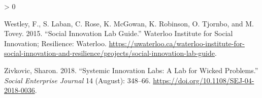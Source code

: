 \documentclass[AMA,STIX1COL,APA,STIX2COL]{WileyNJD-v2}
\newlength{\cslhangindent}
\newenvironment{CSLReferences}[2] %
 {%
  \setlength{\parindent}{0pt}
  \ifodd #1 \everypar{\setlength{\hangindent}{\cslhangindent}}\ignorespaces\fi
  \ifnum #2 > 0
  \setlength{\parskip}{#2\baselineskip}
  \fi
 }%
 {}
\begin{document}
\begin{CSLReferences}{1}{0}
\leavevmode\hypertarget{ref-Westley2015}{}%
Westley, F., S. Laban, C. Rose, K. McGowan, K. Robinson, O. Tjornbo, and
M. Tovey. 2015. {``Social Innovation Lab Guide.''} Waterloo Institute
for Social Innovation; Resilience: Waterloo.
\url{https://uwaterloo.ca/waterloo-institute-for-social-innovation-and-resilience/projects/social-innovation-lab-guide}.

\leavevmode\hypertarget{ref-Zivkovic2018}{}%
Zivkovic, Sharon. 2018. {``Systemic Innovation Labs: A Lab for Wicked
Problems.''} \emph{Social Enterprise Journal} 14 (August): 348--66.
\url{https://doi.org/10.1108/SEJ-04-2018-0036}.

\end{CSLReferences}


\end{document}
